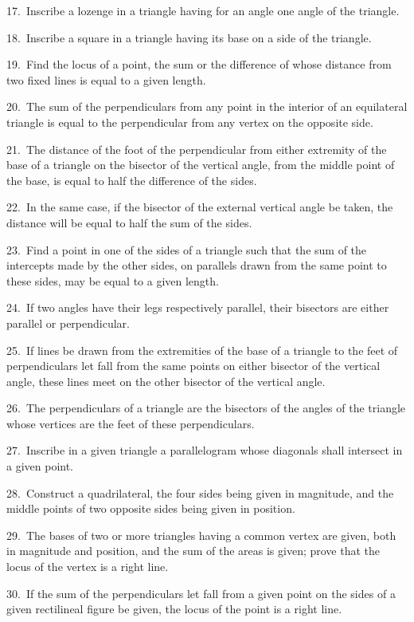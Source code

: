 \documentclass[oneside]{book}
\begin{document}
\begin{footnotesize}
17.~Inscribe a lozenge in a triangle having for an angle one
angle of the triangle.

18.~Inscribe a square in a triangle having its base on a side of
the triangle.

19.~Find the locus of a point, the sum or the difference of
whose distance from two fixed lines is equal to a given length.

20.~The sum of the perpendiculars from any point in the
interior of an equilateral triangle is equal to the perpendicular from
any vertex on the opposite side.

21.~The distance of the foot of the perpendicular from either
extremity of the base of a triangle on the bisector of the vertical
angle, from the middle point of the base, is equal to half the
difference of the sides.

22.~In the same case, if the bisector of the external vertical
angle be taken, the distance will be equal to half the sum of the
sides.

23.~Find a point in one of the sides of a triangle such that the
sum of the intercepts made by the other sides, on parallels drawn
from the same point to these sides, may be equal to a given length.

24.~If two angles have their legs respectively parallel, their
bisectors are either parallel or perpendicular.

25.~If lines be drawn from the extremities of the base of a
triangle to the feet of perpendiculars let fall from the same points
on either bisector of the vertical angle, these lines meet on the
other bisector of the vertical angle.

26.~The perpendiculars of a triangle are the bisectors of the
angles of the triangle whose vertices are the feet of these
perpendiculars.

27.~Inscribe in a given triangle a parallelogram whose diagonals
shall intersect in a given point.

28.~Construct a quadrilateral, the four sides being given in
magnitude, and the middle points of two opposite sides being
given in position.

29.~The bases of two or more triangles having a common
vertex are given, both in magnitude and position, and the sum of the
areas is given; prove that the locus of the vertex is a right line.

30.~If the sum of the perpendiculars let fall from a given
point on the sides of a given rectilineal figure be given, the locus
of the point is a right line.


\end{footnotesize}
\end{document}
